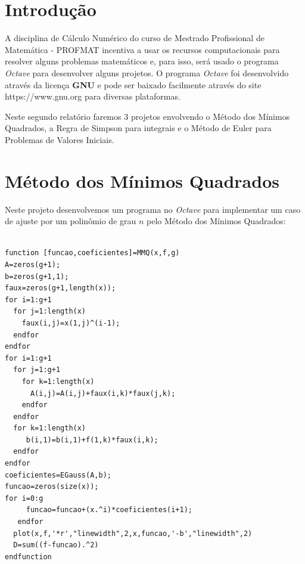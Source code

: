 \documentclass[11pt, openright, a4paper, brazil, openany, oneside]{abntex2}
\begin{document}


\frenchspacing 


\imprimircapa

\imprimirfolhaderosto*

\ABNTEXchapterfont

\tableofcontents*
\cleardoublepage
\textual

\chapter*[Introdução]{Introdução}


A disciplina de Cálculo Numérico do curso de Mestrado Profissional de Matemática - PROFMAT incentiva a usar os recursos computacionais para resolver alguns problemas matemáticos e, para isso, será usado o programa \textit{Octave} para desenvolver alguns projetos. O programa \textit{Octave} foi desenvolvido através da licença \textbf{GNU} e pode ser baixado facilmente através do site https://www.gnu.org para diversas plataformas.

Neste segundo relatório faremos 3 projetos envolvendo o Método dos Mínimos Quadrados, a Regra de Simpson para integrais e o Método de Euler para Problemas de Valores Iniciais.




\chapter{Método dos Mínimos Quadrados}

Neste projeto desenvolvemos um programa no \textit{Octave} para implementar um caso de ajuste por um polinômio de grau $n$ pelo Método dos Mínimos Quadrados: 

\begin{verbatim}

function [funcao,coeficientes]=MMQ(x,f,g)
A=zeros(g+1);
b=zeros(g+1,1);
faux=zeros(g+1,length(x));
for i=1:g+1
  for j=1:length(x)
    faux(i,j)=x(1,j)^(i-1);
  endfor
endfor
for i=1:g+1
  for j=1:g+1
    for k=1:length(x)
      A(i,j)=A(i,j)+faux(i,k)*faux(j,k);
    endfor
  endfor
  for k=1:length(x)
     b(i,1)=b(i,1)+f(1,k)*faux(i,k);
  endfor
endfor
coeficientes=EGauss(A,b);
funcao=zeros(size(x));
for i=0:g
     funcao=funcao+(x.^i)*coeficientes(i+1);
   endfor
  plot(x,f,'*r',"linewidth",2,x,funcao,'-b',"linewidth",2)
  D=sum((f-funcao).^2)
endfunction

\end{verbatim}
\end{document}
